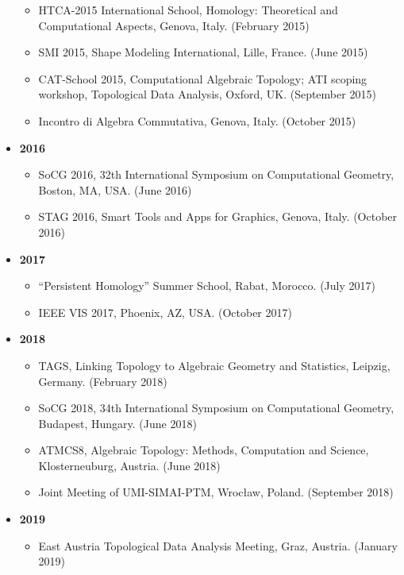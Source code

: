 \documentclass[11pt]{article}
\begin{document}
\begin{itemize}
\begin{itemize}
\item{HTCA-2015 International School, Homology: Theoretical and Computational Aspects, Genova, Italy. (February 2015)}
\item{SMI 2015, Shape Modeling International, Lille, France. (June 2015)}
\item{CAT-School 2015, Computational Algebraic Topology; ATI scoping workshop, Topological Data Analysis, Oxford, UK. (September 2015)}
\item{Incontro di Algebra Commutativa, Genova, Italy. (October 2015)}
\end{itemize}
\vspace*{0.2ex}
\item[ ]{\bf 2016}
\begin{itemize}
\item{SoCG 2016, 32th International Symposium on Computational Geometry, Boston, MA, USA. (June 2016)}
\item{STAG 2016, Smart Tools and Apps for Graphics, Genova, Italy. (October 2016)}
\end{itemize}
\vspace*{0.2ex}
\item[ ]{\bf 2017}
\begin{itemize}
\item{``Persistent Homology'' Summer School, Rabat, Morocco. (July 2017)}
\item{IEEE VIS 2017, Phoenix, AZ, USA. (October 2017)}
\end{itemize}
\vspace*{0.2ex}
\item[ ]{\bf 2018}
\begin{itemize}
\item{TAGS, Linking Topology to Algebraic Geometry and Statistics, Leipzig, Germany. (February 2018)}
\item{SoCG 2018, 34th International Symposium on Computational Geometry, Budapest, Hungary. (June 2018)}
\item{ATMCS8, Algebraic Topology: Methods, Computation and Science, Klosterneuburg, Austria. (June 2018)}
\item{Joint Meeting of UMI-SIMAI-PTM, Wroc\l{}aw, Poland. (September 2018)}
\end{itemize}
\vspace*{0.2ex}
\item[ ]{\bf 2019}
\begin{itemize}
\item{East Austria Topological Data Analysis Meeting, Graz, Austria. (January 2019)}

\end{itemize}
\end{itemize}
\end{document}
